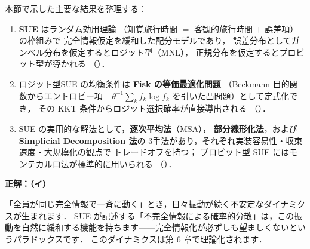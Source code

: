 本節で示した主要な結果を整理する：
\begin{enumerate}
  \item \textbf{SUE} はランダム効用理論
        （知覚旅行時間 $=$ 客観的旅行時間 $+$ 誤差項）の枠組みで
        完全情報仮定を緩和した配分モデルであり，
        誤差分布としてガンベル分布を仮定するとロジット型（MNL），
        正規分布を仮定するとプロビット型が導かれる
        （）．
  \item ロジット型SUE の均衡条件は \textbf{Fisk の等価最適化問題}
        （Beckmann 目的関数からエントロピー項 $-\theta^{-1}\sum_k f_k \log f_k$
        を引いた凸問題）として定式化でき，
        その KKT 条件からロジット選択確率が直接導出される
        （）．
  \item SUE の実用的な解法として，\textbf{逐次平均法}（MSA），
        \textbf{部分線形化法}，および \textbf{Simplicial Decomposition 法}の
        3手法があり，それぞれ実装容易性・収束速度・大規模化の観点で
        トレードオフを持つ；
        プロビット型 SUE にはモンテカルロ法が標準的に用いられる
        （）．
\end{enumerate}

\begin{example}[title={クイズ 6 正解・解説}]
\label{ans:q6}
\textbf{正解：（イ）}

「全員が同じ完全情報で一斉に動く」とき，日々振動が続く不安定なダイナミクスが生まれます．
SUE が記述する「不完全情報による確率的分散」は，この振動を自然に緩和する機能を持ちます——完全情報化が必ずしも望ましくないというパラドックスです．
このダイナミクスは第 6 章で理論化されます．
\end{example}
